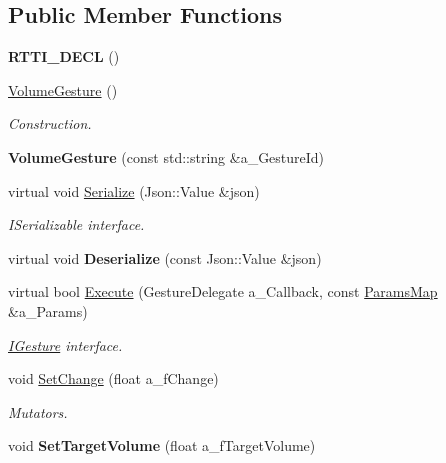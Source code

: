 \subsection*{Public Member Functions}
\begin{DoxyCompactItemize}
\item 
\mbox{\label{class_volume_gesture_a7890f3c16153593699bf39fb6493059f}} 
{\bfseries R\+T\+T\+I\+\_\+\+D\+E\+CL} ()
\item 
\mbox{\label{class_volume_gesture_a765725d9268144e1d2c07e1ac66d76ec}} 
\hyperlink{class_volume_gesture_a765725d9268144e1d2c07e1ac66d76ec}{Volume\+Gesture} ()
\begin{DoxyCompactList}\small\item\em Construction. \end{DoxyCompactList}\item 
\mbox{\label{class_volume_gesture_a66bad1ed769d1bada10a9fe8255602f0}} 
{\bfseries Volume\+Gesture} (const std\+::string \&a\+\_\+\+Gesture\+Id)
\item 
\mbox{\label{class_volume_gesture_abd174855cdbc906bd3a790e10793802f}} 
virtual void \hyperlink{class_volume_gesture_abd174855cdbc906bd3a790e10793802f}{Serialize} (Json\+::\+Value \&json)
\begin{DoxyCompactList}\small\item\em I\+Serializable interface. \end{DoxyCompactList}\item 
\mbox{\label{class_volume_gesture_ae36a593672a2da32ef6aea4923f0496e}} 
virtual void {\bfseries Deserialize} (const Json\+::\+Value \&json)
\item 
\mbox{\label{class_volume_gesture_afa3847c6b25e72f1471501d86a110895}} 
virtual bool \hyperlink{class_volume_gesture_afa3847c6b25e72f1471501d86a110895}{Execute} (Gesture\+Delegate a\+\_\+\+Callback, const \hyperlink{class_params_map}{Params\+Map} \&a\+\_\+\+Params)
\begin{DoxyCompactList}\small\item\em \hyperlink{class_i_gesture}{I\+Gesture} interface. \end{DoxyCompactList}\item 
\mbox{\label{class_volume_gesture_a6568785ada12a4bf742294be6b01e6a9}} 
void \hyperlink{class_volume_gesture_a6568785ada12a4bf742294be6b01e6a9}{Set\+Change} (float a\+\_\+f\+Change)
\begin{DoxyCompactList}\small\item\em Mutators. \end{DoxyCompactList}\item 
\mbox{\label{class_volume_gesture_a8beb02a1450429d36cee2170c3c5b43b}} 
void {\bfseries Set\+Target\+Volume} (float a\+\_\+f\+Target\+Volume)
\end{DoxyCompactItemize}
